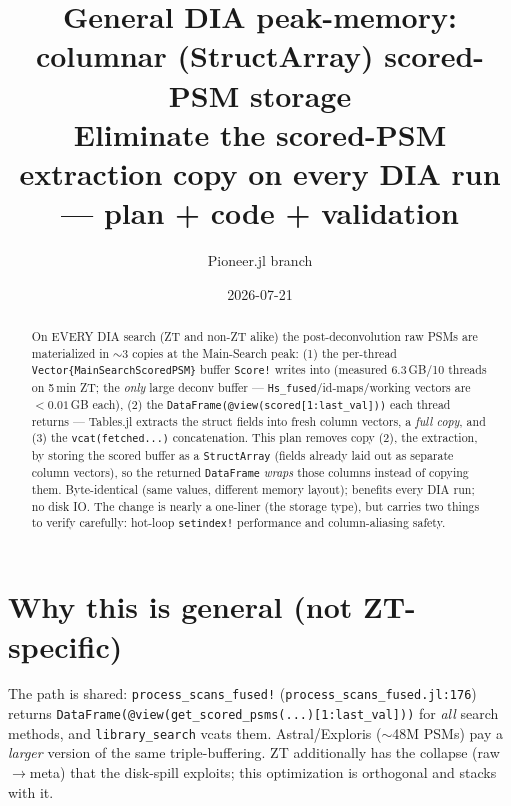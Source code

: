 \documentclass[11pt]{article}
\title{\textbf{General DIA peak-memory: columnar (StructArray) scored-PSM storage}\\[2pt]\large Eliminate the scored-PSM extraction copy on every DIA run --- plan + code + validation}
\author{Pioneer.jl \quad branch \code{feat/zt-batched-collapse}}
\date{2026-07-21}
\newcommand{\code}[1]{\texttt{\small #1}}
\begin{document}
\maketitle

\begin{abstract}
On EVERY DIA search (ZT and non-ZT alike) the post-deconvolution raw PSMs are materialized in
$\sim$3 copies at the Main-Search peak: (1) the per-thread \code{Vector\{MainSearchScoredPSM\}}
buffer \code{Score!} writes into (measured 6.3\,GB/10 threads on 5\,min ZT; the \emph{only}
large deconv buffer --- \code{Hs\_fused}/id-maps/working vectors are $<0.01$\,GB each), (2) the
\code{DataFrame(@view(scored[1:last\_val]))} each thread returns --- Tables.jl extracts the
struct fields into fresh column vectors, a \emph{full copy}, and (3) the \code{vcat(fetched...)}
concatenation. This plan removes copy (2), the extraction, by storing the scored buffer as a
\code{StructArray} (fields already laid out as separate column vectors), so the returned
\code{DataFrame} \emph{wraps} those columns instead of copying them. Byte-identical (same values,
different memory layout); benefits every DIA run; no disk IO. The change is nearly a one-liner
(the storage type), but carries two things to verify carefully: hot-loop \code{setindex!}
performance and column-aliasing safety.
\end{abstract}

\section{Why this is general (not ZT-specific)}
The path is shared: \code{process\_scans\_fused!} (\code{process\_scans\_fused.jl:176}) returns
\code{DataFrame(@view(get\_scored\_psms(...)[1:last\_val]))} for \emph{all} search methods, and
\code{library\_search} vcats them. Astral/Exploris (\(\sim\)48M PSMs) pay a \emph{larger}
version of the same triple-buffering. ZT additionally has the collapse (raw$\to$meta) that the
disk-spill exploits; this optimization is orthogonal and stacks with it.
\end{document}
